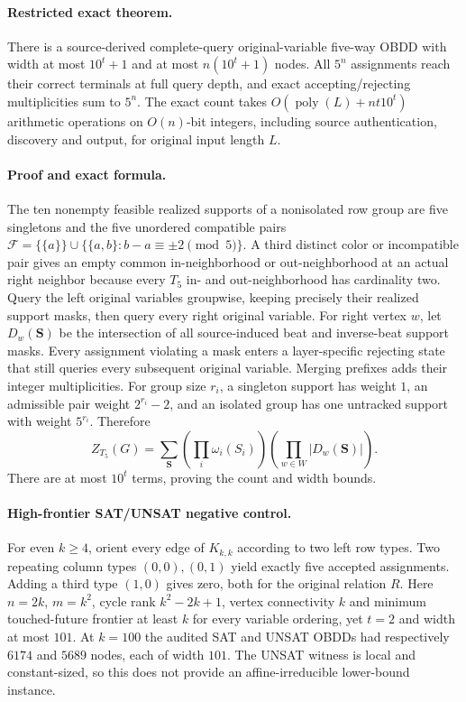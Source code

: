 \documentclass[11pt]{article}
\begin{document}
\paragraph{Restricted exact theorem.}
There is a source-derived complete-query original-variable five-way
OBDD with width at most $10^t+1$ and at most $n(10^t+1)$ nodes.
All $5^n$ assignments reach their correct terminals at full query
depth, and exact accepting/rejecting multiplicities sum to $5^n$.
The exact count takes $O(\operatorname{poly}(L)+nt10^t)$ arithmetic
operations on $O(n)$-bit integers, including source authentication,
discovery and output, for original input length $L$.

\paragraph{Proof and exact formula.}
The ten nonempty feasible realized supports of a nonisolated row group
are five singletons and the five unordered compatible pairs
$\mathcal F=\{\{a\}\}\cup\{\{a,b\}:b-a\equiv\pm2\pmod5\}$.
A third distinct color or incompatible pair gives an empty common
in-neighborhood or out-neighborhood at an actual right neighbor
because every $T_5$ in- and out-neighborhood has cardinality two.
Query the left original variables groupwise, keeping precisely their
realized support masks, then query every right original variable.
For right vertex $w$, let $D_w(\mathbf S)$ be the intersection of
all source-induced beat and inverse-beat support masks.  Every
assignment violating a mask enters a layer-specific rejecting state
that still queries every subsequent original variable.  Merging
prefixes adds their integer multiplicities.
For group size $r_i$, a singleton support has weight $1$, an
admissible pair weight $2^{r_i}-2$, and an isolated group has one
untracked support with weight $5^{r_i}$.  Therefore
\[
 Z_{T_5}(G)=\sum_{\mathbf S}
       \left(\prod_i \omega_i(S_i)\right)
       \left(\prod_{w\in W}|D_w(\mathbf S)|\right).
\]
There are at most $10^t$ terms, proving the count and width bounds.

\paragraph{High-frontier SAT/UNSAT negative control.}
For even $k\ge4$, orient every edge of $K_{k,k}$ according to two
left row types.  Two repeating column types $(0,0),(0,1)$ yield
exactly five accepted assignments.  Adding a third type $(1,0)$
gives zero, both for the original relation $R$.  Here $n=2k$,
$m=k^2$, cycle rank $k^2-2k+1$, vertex connectivity $k$ and
minimum touched-future frontier at least $k$ for every variable
ordering, yet $t=2$ and width at most $101$.
At $k=100$ the audited SAT and UNSAT OBDDs had respectively
$6174$ and $5689$ nodes, each of width $101$.
The UNSAT witness is local and constant-sized, so this does
not provide an affine-irreducible lower-bound instance.
\end{document}
